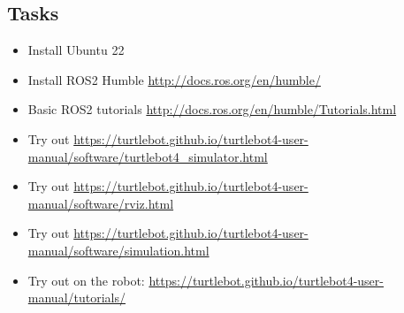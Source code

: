 \documentclass{article}
\begin{document}
\subsection{Tasks}
\begin{itemize}
    \item Install Ubuntu 22
    \item Install ROS2 Humble \url{http://docs.ros.org/en/humble/}
    \item Basic ROS2 tutorials \url{http://docs.ros.org/en/humble/Tutorials.html}
    \item Try out \url{https://turtlebot.github.io/turtlebot4-user-manual/software/turtlebot4_simulator.html}
    \item Try out \url{https://turtlebot.github.io/turtlebot4-user-manual/software/rviz.html}
    \item Try out \url{https://turtlebot.github.io/turtlebot4-user-manual/software/simulation.html}
    \item Try out on the robot: \url{https://turtlebot.github.io/turtlebot4-user-manual/tutorials/}
\end{itemize}
\end{document}
